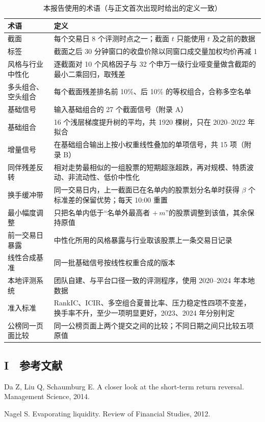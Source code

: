 \documentclass[UTF8,a4paper,zihao=-4,fontset=none]{ctexart}
\newcommand{\tablesetup}{\small\linespread{1.08}\selectfont\renewcommand{\arraystretch}{1.22}}
\begin{document}
\begin{table}[H]
\caption{本报告使用的术语（与正文首次出现时给出的定义一致）}\label{tab:terms}
\centering
{\tablesetup\renewcommand{\arraystretch}{1.0}
\begin{tabularx}{\textwidth}{@{}P{3.3cm} L@{}}
\toprule
术语 & 定义\\
\midrule
截面 & 每个交易日 8 个评测时点之一；截面 $t$ 只能使用 $t$ 及之前的数据\\
标签 & 截面之后 30 分钟窗口的收盘价除以同窗口成交量加权均价再减 1\\
风格与行业中性化 & 逐截面对 10 个风格因子与 32 个申万一级行业哑变量做含截距的最小二乘回归，取残差\\
多头组合、空头组合 & 每个截面残差排名前 10\%、后 10\% 的等权组合，合称多空名单\\
基础信号 & 输入基础组合的 27 个截面信号（附录 A）\\
基础组合 & 16 个浅层梯度提升树的平均，共 1920 棵树，只在 2020–2022 年拟合\\
增量信号 & 在基础组合输出上按小权重线性叠加的单项信号，共 15 项（附录 B）\\
同伴残差反转 & 相对走势最相似的一组股票的短期超涨超跌，再对规模、特质波动、非流动性、低价中性化\\
换手缓冲带 & 同一交易日内，上一截面已在名单内的股票划分名单时获得 $\beta$ 个标准差的保留优势；每天 10:00 重置\\
最小幅度调整 & 只把名单内低于“名单外最高者 $+\,m$”的股票调整到该值，其余保持原值\\
前一交易日暴露 & 中性化所用的风格暴露与行业取该股票上一条交易日记录\\
线性合成基准 & 同一批基础信号按线性权重合成的版本\\
本地评测系统 & 团队自建、与平台口径一致的评测程序，使用 2020–2024 年本地数据\\
准入标准 & RankIC、ICIR、多空组合夏普比率、压力稳定性四项不变差，换手率不升，至少一项明显更好，2023、2024 年分别判定\\
公榜同一页面比较 & 同一公榜页面上两个提交之间的比较；不同日期之间只比较五项原值\\
\bottomrule
\end{tabularx}}
\end{table}

\subsection*{I　参考文献}

\begin{enumerate}[label={[\arabic*]},leftmargin=2.2em]
\item Da Z, Liu Q, Schaumburg E. A closer look at the short-term return reversal. Management Science, 2014.
\item Nagel S. Evaporating liquidity. Review of Financial Studies, 2012.
\end{enumerate}
\end{document}
